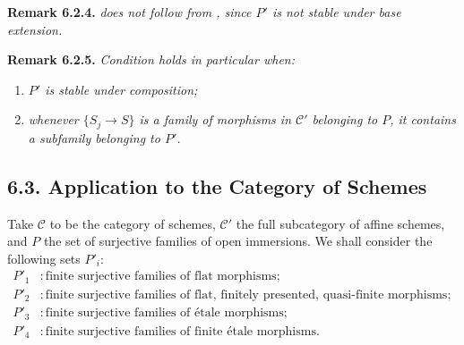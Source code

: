 \medskip
\noindent{}\textbf{Remark 6.2.4.}
\textit{ does not follow from , since \(P'\) is
not stable under base extension.}

\medskip
\noindent{}\textbf{Remark 6.2.5.}
\textit{Condition  holds in particular when:}
\begin{enumerate}
  \item[(i)] \textit{\(P'\) is stable under composition;}
  \item[(ii)] \textit{whenever \(\{S_j\to S\}\) is a family of morphisms in
    \(\mathscr C'\) belonging to \(P\), it contains a subfamily belonging
    to \(P'\).}
\end{enumerate}

\subsection*{6.3. Application to the Category of Schemes}

Take \(\mathscr C\) to be the category of schemes, \(\mathscr C'\) the full
subcategory of affine schemes, and \(P\) the set of surjective families of
open immersions. We shall consider the following sets \(P'_i\):
\begin{align*}
 P'_1 &: \text{finite surjective families of flat morphisms};\\
 P'_2 &: \text{finite surjective families of flat, finitely presented,
          quasi-finite morphisms};\\
 P'_3 &: \text{finite surjective families of \'{e}tale morphisms};\\
 P'_4 &: \text{finite surjective families of finite \'{e}tale morphisms}.
\end{align*}

